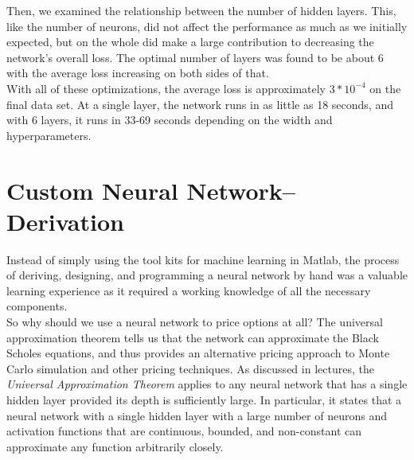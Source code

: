 \documentclass[reqno,14pt]{amsart}
\theoremstyle{plain}
\theoremstyle{definition}
\theoremstyle{remark}
\begin{document}
Then, we examined the relationship between the number of hidden layers. This, like the number of neurons, did not affect the performance as much as we initially expected, but on the whole did make a large contribution to decreasing the network's overall loss. The optimal number of layers was found to be about 6 with the average loss increasing on both sides of that.\\
With all of these optimizations, the average loss is approximately $3*10^{-4}$ on the final data set. At a single layer, the network runs in as little as 18 seconds, and with 6 layers, it runs in 33-69 seconds depending on the width and hyperparameters.\\

\section{Custom Neural Network--Derivation}
Instead of simply using the tool kits for machine learning in Matlab, the process of deriving, designing, and programming a neural network by hand was a valuable learning experience as it required a working knowledge of all the necessary components.\\

So why should we use a neural network to price options at all? The universal approximation theorem tells us that the network can approximate the Black Scholes equations, and thus provides an alternative pricing approach to Monte Carlo simulation and other pricing techniques. As discussed in lectures, the \textit{Universal Approximation Theorem} applies to any neural network that has a single hidden layer provided its depth is sufficiently large. In particular, it states that a neural network with a single hidden layer with a large number of neurons and activation functions that are continuous, bounded, and non-constant can approximate any function arbitrarily closely.\\
\end{document}
